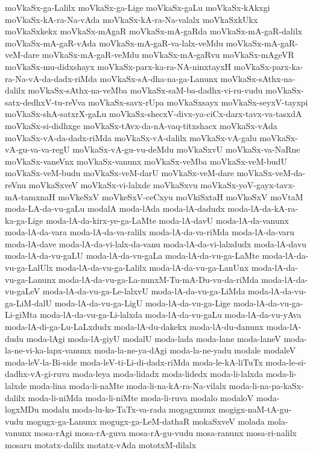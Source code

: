 {moVkaSx-ga-Lalilx
moVkaSx-ga-Lige
moVkaSx-gaLu
moVkaSx-kAkxgi
moVkaSx-kA-ra-Na-vAda
moVkaSx-kA-ra-Na-valalx
moVkaSxkUkx
moVkaSxkekx
moVkaSx-mAgaR
moVkaSx-mA-gaRda
moVkaSx-mA-gaR-dalilx
moVkaSx-mA-gaR-vAda
moVkaSx-mA-gaR-va-lalx-veMdu
moVkaSx-mA-gaR-veM-dare
moVkaSx-mA-gaR-veMdu
moVkaSx-mA-gaRvu
moVkaSx-mAgeVR
moVkaSx-mu-didxshayx
moVkaSx-parx-ka-ra-NA-ninxtayxH
moVkaSx-parx-ka-ra-Na-vA-da-dadx-riMda
moVkaSx-sA-dha-na-ga-Lanunx
moVkaSx-sAthx-na-dalilx
moVkaSx-sAthx-na-veMba
moVkaSx-saM-ba-dadhx-vi-ru-vudu
moVkaSx-satx-dedhxV-tu-reVva
moVkaSx-savx-rUpa
moVkaSxsayx
moVkaSx-seyxV-tayxpi
moVkaSx-shA-satxrX-gaLu
moVkaSx-shecxV-divx-ya-ciCx-darx-tavx-va-tasxdA
moVkaSx-si-didhxge
moVkaSx-tAvx-da-nA-vaq-titxshacx
moVkaSx-vAda
moVkaSx-vA-da-dadx-riMda
moVkaSx-vA-dalilx
moVkaSx-vA-galu
moVkaSx-vA-gu-va-va-regU
moVkaSx-vA-gu-vu-deMdu
moVkaSxvU
moVkaSx-va-NaRne
moVkaSx-vaneVnx
moVkaSx-vanunx
moVkaSx-veMba
moVkaSx-veM-budU
moVkaSx-veM-budu
moVkaSx-veM-darU
moVkaSx-veM-dare
moVkaSx-veM-da-reVnu
moVkaSxveV
moVkaSx-vi-lalxde
moVkaSxvu
moVkaSx-yoV-gayx-tavx-mA-tamxnaH
moVkeSxV
moVkeSxV-ceCxyu
moVkiSxtaH
moVkoSxV
moVtaM
moda-LA-da-vu-gaLu
modalA
moda-lAda
moda-lA-dadudx
moda-lA-da-kA-ra-ka-ga-Lige
moda-lA-da-kirx-ye-ga-LaMte
moda-lA-davU
moda-lA-da-vanunx
moda-lA-da-vara
moda-lA-da-va-ralilx
moda-lA-da-va-riMda
moda-lA-da-varu
moda-lA-dave
moda-lA-da-vi-lalx-da-vanu
moda-lA-da-vi-lalxdudx
moda-lA-davu
moda-lA-da-vu-gaLU
moda-lA-da-vu-gaLa
moda-lA-da-vu-ga-LaMte
moda-lA-da-vu-ga-LalUlx
moda-lA-da-vu-ga-Lalilx
moda-lA-da-vu-ga-LanUnx
moda-lA-da-vu-ga-Lanunx
moda-lA-da-vu-ga-La-nunxM-Tu-mA-Du-vu-da-riMda
moda-lA-da-vu-gaLeV
moda-lA-da-vu-ga-Le-lalxvU
moda-lA-da-vu-ga-LiMda
moda-lA-da-vu-ga-LiM-dalU
moda-lA-da-vu-ga-LigU
moda-lA-da-vu-ga-Lige
moda-lA-da-vu-ga-Li-giMta
moda-lA-da-vu-ga-Li-lalxda
moda-lA-da-vu-gaLu
moda-lA-da-vu-yAva
moda-lA-di-ga-Lu-LaLxdudx
moda-lA-du-dakekx
moda-lA-du-danunx
moda-lA-dudu
moda-lAgi
moda-lA-giyU
modalU
moda-lada
moda-lane
moda-laneV
moda-la-ne-vi-ka-lapx-vanunx
moda-la-ne-ya-dAgi
moda-la-ne-yadu
modale
modaleV
moda-leV-la-Bi-side
moda-leV-ti-Li-di-dadx-riMda
moda-le-kA-liTuTx
moda-le-si-dadhx-vA-gi-ruva
moda-leya
moda-lidadx
moda-lidedx
moda-li-lalxda
moda-li-lalxde
moda-lina
moda-li-naMte
moda-li-na-kA-ra-Na-vilalx
moda-li-na-pa-kaSx-dalilx
moda-li-niMda
moda-li-niMte
moda-li-ruva
modalo
modaloV
moda-logxMDu
modalu
moda-lu-ko-TaTx-va-rada
mogagxnunx
mogigx-naM-tA-gu-vudu
mogugx-ga-Lanunx
mogugx-ga-LeM-dathaR
mokaSxveV
molada
mola-vanunx
mosa-rAgi
mosa-rA-guva
mosa-rA-gu-vudu
mosa-ranunx
mosa-ri-nalilx
mosaru
motatx-dalilx
motatx-vAda
mototxM-dilalx
}
